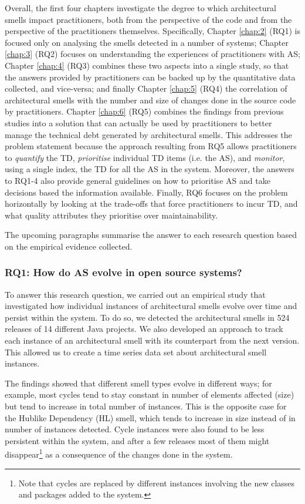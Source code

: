 Overall, the first four chapters investigate the degree to which architectural smells impact practitioners, both from the perspective of the code and from the perspective of the practitioners themselves.
Specifically, Chapter \ref{chap:2} (RQ1) is focused only on analysing the smells detected in a number of systems;
Chapter \ref{chap:3} (RQ2) focuses on understanding the experiences of practitioners with AS; Chapter \ref{chap:4} (RQ3) combines these two aspects into a single study, so that the answers provided by practitioners can be backed up by the quantitative data collected, and vice-versa; and finally Chapter \ref{chap:5} (RQ4) the correlation of architectural smells with the number and size of changes done in the source code by practitioners.
Chapter \ref{chap:6} (RQ5) combines the findings from previous studies into a solution that can actually be used by practitioners to better manage the technical debt generated by architectural smells.
This addresses the problem statement because the approach resulting from RQ5 allows practitioners to \emph{quantify} the TD, \emph{prioritise} individual TD items (i.e. the AS), and \emph{monitor}, using a single index, the TD for all the AS in the system.
Moreover, the answers to RQ1-4 also provide general guidelines on how to prioritise AS and take decisions based the information available.
Finally, RQ6 focuses on the problem horizontally by looking at the trade-offs that force practitioners to incur TD, and what quality attributes they prioritise over maintainability.

The upcoming paragraphs summarise the answer to each research question based on the empirical evidence collected.

\subsubsection*{RQ1: How do AS evolve in open source systems?}
To answer this research question, we carried out an empirical study that investigated how individual instances of architectural smells evolve over time and persist within the system.
To do so, we detected the architectural smells in 524 releases of 14 different Java projects. 
We also developed an approach to track each instance of an architectural smell with its counterpart from the next version.
This allowed us to create a time series data set about architectural smell instances.

The findings showed that different smell types evolve in different ways; for example, most cycles tend to stay constant in number of elements affected (size) but tend to increase in total number of instances.
This is the opposite case for the Hublike Dependency (HL) smell, which tends to increase in size instead of in number of instances detected.
Cycle instances were also found to be less persistent within the system, and after a few releases most of them might disappear\footnote{Note that cycles are replaced by different instances involving the new classes and packages added to the system.} as a consequence of the changes done in the system.

